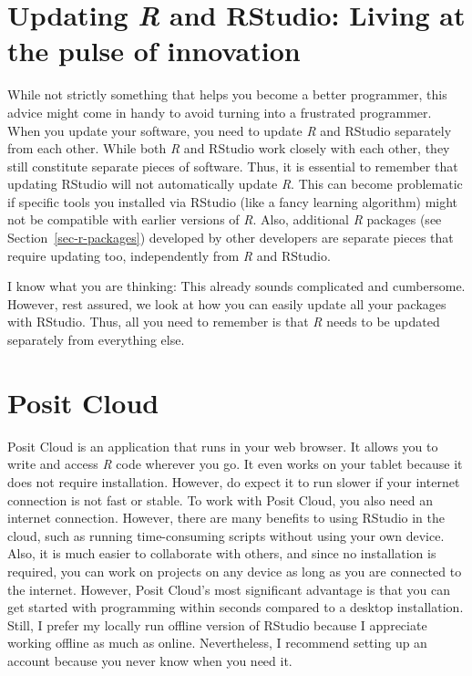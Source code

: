 \documentclass[
  letterpaper,
]{krantz}
\begin{document}
\section{\texorpdfstring{Updating \emph{R} and RStudio: Living at the
pulse of
innovation}{Updating R and RStudio: Living at the pulse of innovation}}\label{sec-updating-r-and-rstudio}

While not strictly something that helps you become a better programmer,
this advice might come in handy to avoid turning into a frustrated
programmer. When you update your software, you need to update \emph{R}
and RStudio separately from each other. While both \emph{R} and RStudio
work closely with each other, they still constitute separate pieces of
software. Thus, it is essential to remember that updating RStudio will
not automatically update \emph{R}. This can become problematic if
specific tools you installed via RStudio (like a fancy learning
algorithm) might not be compatible with earlier versions of \emph{R}.
Also, additional \emph{R} packages (see Section~\ref{sec-r-packages})
developed by other developers are separate pieces that require updating
too, independently from \emph{R} and RStudio.

I know what you are thinking: This already sounds complicated and
cumbersome. However, rest assured, we look at how you can easily update
all your packages with RStudio. Thus, all you need to remember is that
\emph{R} needs to be updated separately from everything else.

\section{Posit Cloud}\label{sec-rstudio-cloud}

Posit Cloud is an application that runs in your web browser. It allows
you to write and access \emph{R} code wherever you go. It even works on
your tablet because it does not require installation. However, do expect
it to run slower if your internet connection is not fast or stable. To
work with Posit Cloud, you also need an internet connection. However,
there are many benefits to using RStudio in the cloud, such as running
time-consuming scripts without using your own device. Also, it is much
easier to collaborate with others, and since no installation is
required, you can work on projects on any device as long as you are
connected to the internet. However, Posit Cloud's most significant
advantage is that you can get started with programming within seconds
compared to a desktop installation. Still, I prefer my locally run
offline version of RStudio because I appreciate working offline as much
as online. Nevertheless, I recommend setting up an account because you
never know when you need it.
\end{document}

